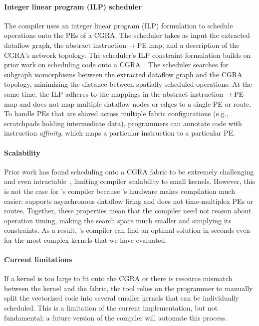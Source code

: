 \paragraph{Integer linear program (ILP) scheduler}
The compiler uses an integer linear program (ILP) formulation to schedule
operations onto the PEs of a CGRA.
% 
The scheduler takes as input the extracted dataflow graph, the abstract
instruction$\rightarrow$PE map, and a description of the CGRA's network 
topology.
% 
The scheduler's ILP constraint formulation builds on prior work on scheduling code onto a CGRA~\cite{nowatzki2013general}.
% 
The scheduler searches for subgraph isomorphisms between the extracted
dataflow graph and the CGRA topology, minimizing the distance between
spatially scheduled operations.
% 
At the same time, the ILP adheres to the mappings in the abstract
instruction$\rightarrow$PE map and does not map multiple dataflow nodes or
edges to a single PE or route.
%
To handle PEs that are shared across multiple fabric configurations
(e.g., scratchpads holding intermediate data), programmers can
annotate code with instruction {\em affinity}, which maps a
particular instruction to a particular PE.
 
\paragraph{Scalability}
Prior work has found scheduling onto a CGRA fabric to be
extremely challenging and even
intractable~\cite{dave2018ramp,kou2020taem,nowatzki2018hybrid,weng2020dsagen},
limiting compiler scalability to small kernels.
% 
However, this is not the case for \snafu's compiler because \snafu's
hardware makes compilation much easier:
%
\snafu supports asynchronous dataflow firing
and does not time-multiplex PEs or routes.
%
Together, these properties mean that the compiler need not reason
about operation timing, making the search space much smaller
and simplying its constraints.
% 
As a result, \snafu's compiler can find an optimal solution in seconds
even for the most complex kernels that we have evaluated.

\paragraph{Current limitations}
If a kernel is too large to fit onto the CGRA or there is resource mismatch between the kernel and the fabric, the tool relies on the programmer to manually split the vectorized code into several smaller kernels that can be individually scheduled.
% 
This is a limitation of the current implementation, but not fundamental;
a future version of the compiler will automate this process.
